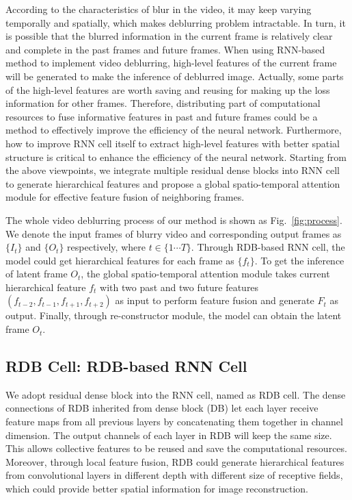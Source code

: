 \documentclass[twocolumn]{svjour3}          \smartqed  \usepackage{graphicx}
\begin{document}
According to the characteristics of blur in the video, it may keep varying temporally and spatially, which makes deblurring problem intractable. In turn, it is possible that the blurred information in the current frame is relatively clear and complete in the past frames and future frames. When using RNN-based method to implement video deblurring, high-level features of the current frame will be generated to make the inference of deblurred image. Actually, some parts of the high-level features are worth saving and reusing for making up the loss information for other frames. Therefore, distributing part of computational resources to fuse informative features in past and future frames could be a method to effectively improve the efficiency of the neural network. Furthermore, how to improve RNN cell itself to extract high-level features with better spatial structure is critical to enhance the efficiency of the neural network. Starting from the above viewpoints, we integrate multiple residual dense blocks into RNN cell to generate hierarchical features and propose a global spatio-temporal attention module for effective feature fusion of neighboring frames.

The whole video deblurring process of our method is shown as Fig.~\ref{fig:process}. We denote the input frames of blurry video and corresponding output frames as $\{I_t\}$ and $\{O_t\}$ respectively, where $t \in \{1\cdots T\}$. Through RDB-based RNN cell, the model could get hierarchical features for each frame as $\{f_t\}$. To get the inference of latent frame $O_t$, the global spatio-temporal attention module takes current hierarchical feature $f_t$ with two past and two future features $(f_{t-2}, f_{t-1}, f_{t+1}, f_{t+2})$ as input to perform feature fusion and generate $F_t$ as output. Finally, through re-constructor module, the model can obtain the latent frame $O_t$.

\subsection{RDB Cell: RDB-based RNN Cell}
\label{sec:RDB}

We adopt residual dense block \cite{zhang2018residual, zhang2020residual} into the RNN cell, named as RDB cell. The dense connections of RDB inherited from dense block (DB) \cite{huang2017densely} let each layer receive feature maps from all previous layers by concatenating them together in channel dimension. The output channels of each layer in RDB will keep the same size. This allows collective features to be reused and save the computational resources. Moreover, through local feature fusion, RDB could generate hierarchical features from convolutional layers in different depth with different size of receptive fields, which could provide better spatial information for image reconstruction.
\end{document}

